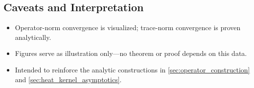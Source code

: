 \subsection*{Caveats and Interpretation}

\begin{itemize}
  \item Operator-norm convergence is visualized; trace-norm convergence is proven analytically.
  \item Figures serve as illustration only—no theorem or proof depends on this data.
  \item Intended to reinforce the analytic constructions in \cref{sec:operator_construction} and \cref{sec:heat_kernel_asymptotics}.
\end{itemize}
